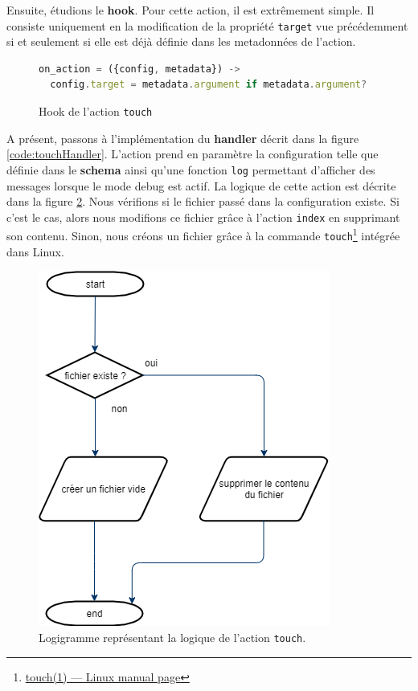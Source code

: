 \documentclass[12pt, french]{report}
\begin{document}
Ensuite, étudions le \textbf{hook}. Pour cette action, il est extrêmement simple. Il consiste uniquement en la modification de la propriété \texttt{target} vue précédemment si et seulement si elle est déjà définie dans les metadonnées de l'action.

\begin{figure}[h]
\begin{lstlisting}[language=JavaScript]
on_action = ({config, metadata}) ->
  config.target = metadata.argument if metadata.argument?
\end{lstlisting}
\centering
\caption{Hook de l'action \texttt{touch}}
\label{code:touchHook}
\end{figure}

A présent, passons à l'implémentation du \textbf{handler} décrit dans la figure \ref{code:touchHandler}. L'action prend en paramètre la configuration telle que définie dans le \textbf{schema} ainsi qu'une fonction \texttt{log} permettant d'afficher des messages lorsque le mode debug est actif. La logique de cette action est décrite dans la figure \ref{fig:touch}. Nous vérifions si le fichier passé dans la configuration existe. Si c'est le cas, alors nous modifions ce fichier grâce à l'action \texttt{index} en supprimant son contenu. Sinon, nous créons un fichier grâce à la commande \texttt{touch}\footnote{\href{https://man7.org/linux/man-pages/man1/touch.1.html}{touch(1) — Linux manual page}} intégrée dans Linux.

\begin{figure}[H]
\includegraphics[scale=0.5]{assets/img/touch.png}
\centering
\caption{Logigramme représentant la logique de l'action \texttt{touch}.}
\label{fig:touch}
\end{figure}
\end{document}
